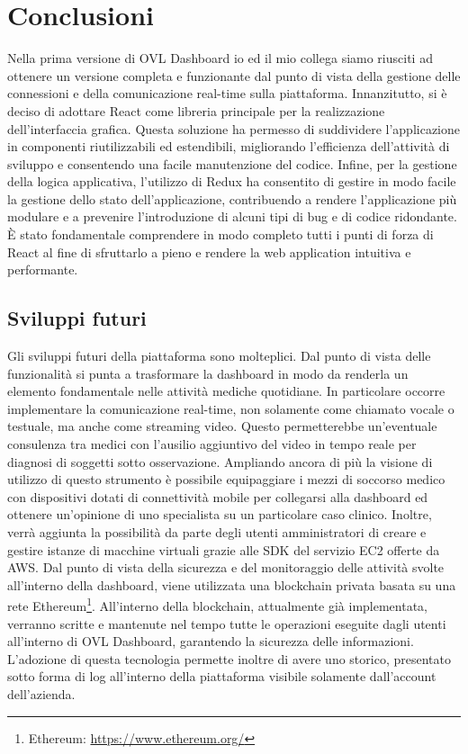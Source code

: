 \chapter{Conclusioni}
\label{chap:conclusioni}

Nella prima versione di OVL Dashboard io ed il mio collega siamo riusciti ad ottenere un versione completa e funzionante dal punto di vista della gestione delle connessioni e della comunicazione real-time sulla piattaforma.
Innanzitutto, si è deciso di adottare React come libreria principale per la realizzazione dell'interfaccia grafica. Questa soluzione ha permesso di suddividere l’applicazione in componenti riutilizzabili ed estendibili, migliorando l’efficienza dell'attività di sviluppo e consentendo una facile manutenzione del codice. Infine, per la gestione della logica applicativa, l’utilizzo di Redux ha consentito di gestire in modo facile la gestione dello stato dell'applicazione, contribuendo a rendere l’applicazione più modulare e a prevenire l’introduzione di alcuni tipi di bug e di codice ridondante. È stato fondamentale comprendere in modo completo tutti i punti di forza di React al fine di sfruttarlo a pieno e rendere la web application intuitiva e performante. 

\section{Sviluppi futuri}
\label{sec:sviluppi futuri}
Gli sviluppi futuri della piattaforma sono molteplici. Dal punto di vista delle funzionalità si punta a trasformare la dashboard in modo da renderla un elemento fondamentale nelle attività mediche quotidiane. In particolare occorre implementare la comunicazione real-time, non solamente come chiamato vocale o testuale, ma anche come streaming video. Questo permetterebbe un'eventuale consulenza tra medici con l'ausilio aggiuntivo del video in tempo reale per diagnosi di soggetti sotto osservazione. Ampliando ancora di più la visione di utilizzo di questo strumento è possibile equipaggiare i mezzi di soccorso medico con dispositivi dotati di connettività mobile per collegarsi alla dashboard ed ottenere un'opinione di uno specialista su un particolare caso clinico.
Inoltre, verrà aggiunta la possibilità da parte degli utenti amministratori di creare e gestire istanze di macchine virtuali grazie alle SDK del servizio EC2 offerte da AWS.
Dal punto di vista della sicurezza e del monitoraggio delle attività svolte all'interno della dashboard, viene utilizzata una blockchain privata basata su una rete Ethereum\footnote{Ethereum: \url{https://www.ethereum.org/}}. All'interno della blockchain, attualmente già implementata, verranno scritte e mantenute nel tempo tutte le operazioni eseguite dagli utenti all'interno di OVL Dashboard, garantendo la sicurezza delle informazioni. L'adozione di questa  tecnologia permette inoltre di avere uno storico, presentato sotto forma di log all'interno della piattaforma visibile solamente dall'account dell'azienda.
